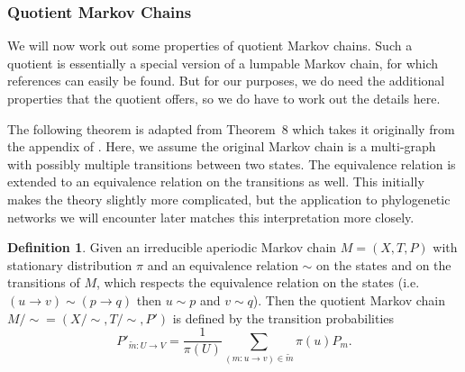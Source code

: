 \documentclass{article}
\theoremstyle{definition}
\newtheorem{definition}{Definition}
\begin{document}
\subsubsection{Quotient Markov Chains}\label{sec:quotient_markov_chains}
We will now work out some properties of quotient Markov chains. 
Such a quotient is essentially a special version of a lumpable Markov chain, for which references can easily be found. 
But for our purposes, we do need the additional properties that the quotient offers, so we do have to work out the details here.

The following theorem is adapted from \cite{mitavskiy2008quotients} Theorem~8 which takes it originally from the appendix of \cite{vose1999simple}. %
Here, we assume the original Markov chain is a multi-graph with possibly multiple transitions between two states. The equivalence relation is extended to an equivalence relation on the transitions as well. This initially makes the theory slightly more complicated, but the application to phylogenetic networks we will encounter later matches this interpretation more closely.

\begin{definition}\label{def:quotient_markov_chain}
    Given an irreducible aperiodic Markov chain $M=(X,T,P)$ with stationary distribution $\pi$ and an equivalence relation $\sim$ on the states and on the transitions of $M$, which respects the equivalence relation on the states (i.e. $(u\to v)\sim (p \to q)$ then $u\sim p$ and $v\sim q$). Then the quotient Markov chain $M/\sim=(X/\sim, T/\sim, P')$ is defined by the transition probabilities
    \[
       P'_{\widetilde{m}: U\to V} = \frac{1}{\pi(U)} \sum_{(m:u\to v)\in\widetilde{m}}\pi(u)P_m.
    \]
\end{definition}
\end{document}
